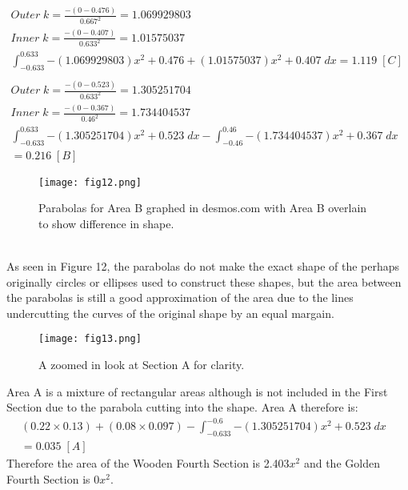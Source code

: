 \documentclass[a4paper,12pt]{article}
\begin{document}
\begin{equation}
\begin{aligned} 
Outer\; k=\frac{-(0-0.476)}{0.667^2}=1.069929803\\
Inner\; k=\frac{-(0-0.407)}{0.633^2}=1.01575037\\
\int_{-0.633}^{0.633}{-(1.069929803)x^2+0.476+(1.01575037)x^2+0.407}\;dx=1.119\; [C]&\\\\
Outer\; k=\frac{-(0-0.523)}{0.633^2}=1.305251704\\
Inner\; k=\frac{-(0-0.367)}{0.46^2}=1.734404537\\
\int_{-0.633}^{0.633}{-(1.305251704)x^2+0.523}\;dx-\int_{-0.46}^{0.46}{-(1.734404537)x^2+0.367}\;dx&\\=0.216\;[B] 
\end{aligned}
\end{equation}
\begin{figure}[h!]
\centering
\texttt{[image: fig12.png]}
\caption{Parabolas for Area B graphed in desmos.com with Area B overlain to show difference in shape.}
\label{fig:clock12}
\end{figure}
\\As seen in Figure 12, the parabolas do not make the exact shape of the perhaps originally circles or ellipses used to construct these shapes, but the area between the parabolas is still a good approximation of the area due to the lines undercutting the curves of the original shape by an equal margain. 
\begin{figure}[h!]
\centering
\texttt{[image: fig13.png]}
\caption{A zoomed in look at Section A for clarity.}
\label{fig:clock13}
\end{figure}

Area A is a mixture of rectangular areas although is not included in the First Section due to the parabola cutting into the shape. Area A therefore is:
\begin{equation}
\begin{aligned} 
(0.22\times0.13)+(0.08\times0.097)- \int_{-0.633}^{-0.6}{-(1.305251704)x^2+0.523}\;dx&\\=0.035\;[A]
\end{aligned}
\end{equation}
Therefore the area of the Wooden Fourth Section is 2.403$x^2$ and the Golden Fourth Section is 0$x^2$.
\end{document}
